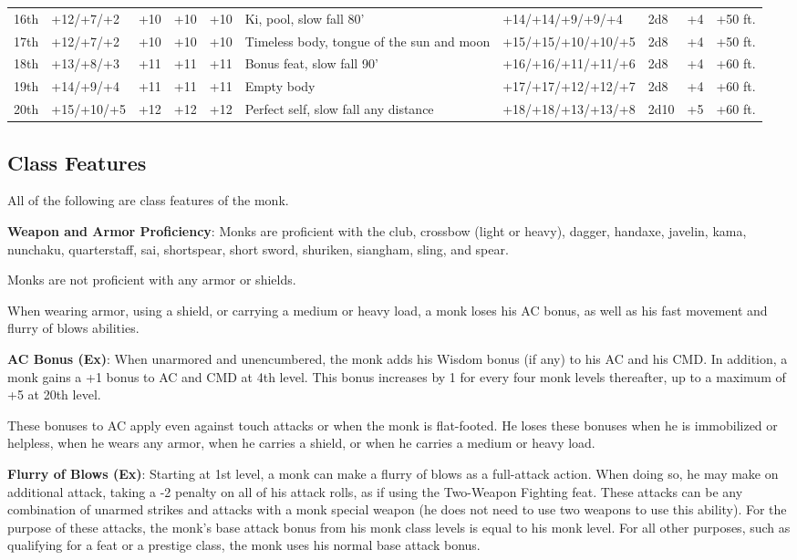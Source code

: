 \begin{table*}[]
\begin{tabularx}{\linewidth}{lllllXllll}
16th & +12/+7/+2 & +10 & +10 & +10 & Ki,  pool, slow fall 80' & +14/+14/+9/+9/+4 & 2d8 & +4 & +50 ft.\\
17th & +12/+7/+2 & +10 & +10 & +10 & Timeless body, tongue of the sun and moon & +15/+15/+10/+10/+5 & 2d8 & +4 & +50 ft.\\
18th & +13/+8/+3 & +11 & +11 & +11 & Bonus feat, slow fall 90' & +16/+16/+11/+11/+6 & 2d8 & +4 & +60 ft.\\
19th & +14/+9/+4 & +11 & +11 & +11 & Empty body & +17/+17/+12/+12/+7 & 2d8 & +4 & +60 ft.\\
20th & +15/+10/+5 & +12 & +12 & +12 & Perfect self, slow fall any distance & +18/+18/+13/+13/+8 & 2d10 & +5 & +60 ft.\\
\end{tabularx}
\end{table*}

				
\subsection{Class Features}

				
All of the following are class features of the monk.
				
\textbf{Weapon and Armor Proficiency}: Monks are proficient with the club, crossbow (light or heavy), dagger, handaxe, javelin, kama, nunchaku, quarterstaff, sai, shortspear, short sword, shuriken, siangham, sling, and spear.
				
Monks are not proficient with any armor or shields.
				
When wearing armor, using a shield, or carrying a medium or heavy load, a monk loses his AC bonus, as well as his fast movement and flurry of blows abilities.
				
\textbf{AC Bonus (Ex)}: When unarmored and unencumbered, the monk adds his Wisdom bonus (if any) to his AC and his CMD. In addition, a monk gains a +1 bonus to AC and CMD at 4th level. This bonus increases by 1 for every four monk levels thereafter, up to a maximum of +5 at 20th level.
				
These bonuses to AC apply even against touch attacks or when the monk is flat-footed. He loses these bonuses when he is immobilized or helpless, when he wears any armor, when he carries a shield, or when he carries a medium or heavy load.
				
\textbf{Flurry of Blows (Ex)}: Starting at 1st level, a monk can make a flurry of blows as a full-attack action. When doing so, he may make on additional attack, taking a -2 penalty on all of his attack rolls, as if using the Two-Weapon Fighting feat. These attacks can be any combination of unarmed strikes and attacks with a monk special weapon (he does not need to use two weapons to use this ability). For the purpose of these attacks, the monk's base attack bonus from his monk class levels is equal to his monk level. For all other purposes, such as qualifying for a feat or a prestige class, the monk uses his normal base attack bonus. 
				
